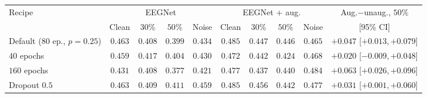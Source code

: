 \begin{tabular}{lccccccccc}
\toprule
Recipe & \multicolumn{4}{c}{EEGNet} & \multicolumn{4}{c}{EEGNet + aug.} & Aug.$-$unaug., $50\%$ \\ & Clean & $30\%$ & $50\%$ & Noise & Clean & $30\%$ & $50\%$ & Noise & [95\% CI] \\
\midrule
Default ($80$ ep., $p{=}0.25$) & $0.463$ & $0.408$ & $0.399$ & $0.434$ & $0.485$ & $0.447$ & $0.446$ & $0.465$ & $+0.047$ [$+0.013,+0.079$] \\
$40$ epochs & $0.459$ & $0.417$ & $0.404$ & $0.430$ & $0.472$ & $0.442$ & $0.424$ & $0.468$ & $+0.020$ [$-0.009,+0.048$] \\
$160$ epochs & $0.431$ & $0.408$ & $0.377$ & $0.421$ & $0.477$ & $0.437$ & $0.440$ & $0.484$ & $+0.063$ [$+0.026,+0.096$] \\
Dropout $0.5$ & $0.463$ & $0.409$ & $0.411$ & $0.459$ & $0.485$ & $0.456$ & $0.442$ & $0.477$ & $+0.031$ [$+0.001,+0.060$] \\
\bottomrule
\end{tabular}
